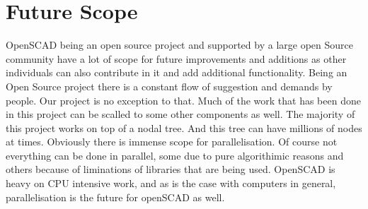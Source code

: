 \section{Future Scope}
OpenSCAD being an open source project and supported by a large open Source community have a lot of scope for future improvements and additions as other individuals can also contribute in it and add additional functionality. Being an Open Source project there is a constant flow of suggestion and demands by people. Our project is no exception to that. Much of the work that has been done in this project can be scalled to some other components as well. The majority of this project works on top of a nodal tree. And this tree can have millions of nodes at times. Obviously there is immense scope for parallelisation. Of course not everything can be done in parallel, some due to pure algorithimic reasons and others because of liminations of libraries that are being used. OpenSCAD is heavy on CPU intensive work, and as is the case with computers in general, parallelisation is the future for openSCAD as well.
